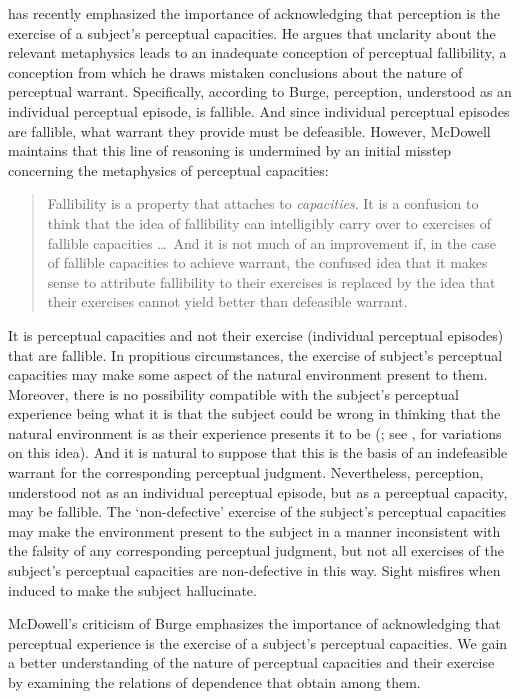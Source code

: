 \documentclass[12pt]{article}
\begin{document}
\citet{McDowell:2010fk} has recently emphasized the importance of acknowledging that perception is the exercise of a subject's perceptual capacities. He argues that unclarity about the relevant metaphysics leads \citet{Burge:2005uq} to an inadequate conception of perceptual fallibility, a conception from which he draws mistaken conclusions about the nature of perceptual warrant. Specifically, according to Burge, perception, understood as an individual perceptual episode, is fallible. And since individual perceptual episodes are fallible, what warrant they provide must be defeasible. However, McDowell maintains that this line of reasoning is undermined by an initial misstep concerning the metaphysics of perceptual capacities:
\begin{quote}
	Fallibility is a property that attaches to \emph{capacities}. It is a confusion to think that the idea of fallibility can intelligibly carry over to exercises of fallible capacities \ldots\ And it is not much of an improvement if, in the case of fallible capacities to achieve warrant, the confused idea that it makes sense to attribute fallibility to their exercises is replaced by the idea that their exercises cannot yield better than defeasible warrant. \citep[245]{McDowell:2010fk}
\end{quote}
It is perceptual capacities and not their exercise (individual perceptual episodes) that are fallible. In propitious circumstances, the exercise of subject's perceptual capacities may make some aspect of the natural environment present to them. Moreover, there is no possibility compatible with the subject's perceptual experience being what it is that the subject could be wrong in thinking that the natural environment is as their experience presents it to be (\citealt[245]{McDowell:2010fk}; see  \citealt{Johnston:2006uq}, \citealt{Kalderon:2011fk} for variations on this idea). And it is natural to suppose that this is the basis of an indefeasible warrant for the corresponding perceptual judgment. Nevertheless, perception, understood not as an individual perceptual episode, but as a perceptual capacity, may be fallible. The `non-defective' exercise of the subject's perceptual capacities may make the environment present to the subject in a manner inconsistent with the falsity of any corresponding perceptual judgment, but not all exercises of the subject's perceptual capacities are non-defective in this way. Sight misfires when induced to make the subject hallucinate.

McDowell's criticism of Burge emphasizes the importance of acknowledging that perceptual experience is the exercise of a subject's perceptual capacities. We gain a better understanding of the nature of perceptual capacities and their exercise by examining the relations of dependence that obtain among them.
\end{document}
